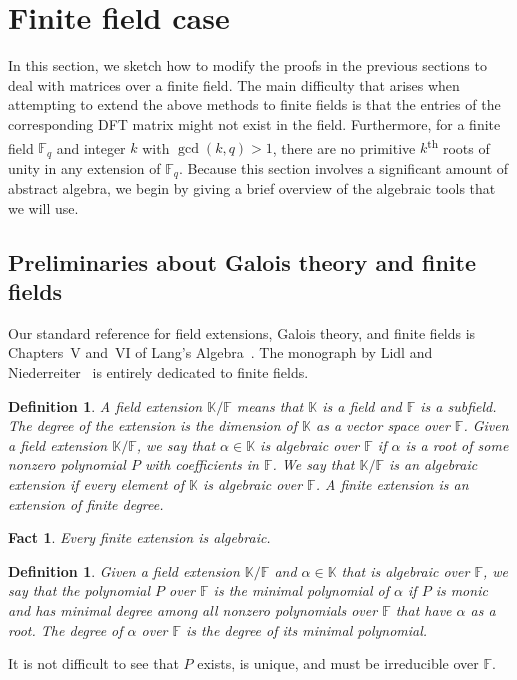 \documentclass{toc}
\newtheorem{define}[theorem]{Definition}
\newtheorem{fact.}[theorem]{Fact}
\newcommand\F{{\mathbb{F}}}
\newcommand\K{{\mathbb{K}}}
\newcommand{\ts}{\textsuperscript}
\begin{document}
%
%
%

%
\section{Finite field case}\label{sec_finitefield}  %
In this section, we sketch how to modify the proofs in the previous sections to deal with matrices over a finite field.  The main difficulty that arises when attempting to extend the above methods to finite fields is that the entries of the corresponding %
DFT %
 matrix might not exist in the field.  Furthermore, for a finite field $\F_q$ and integer $k$ with $\gcd(k,q) > 1$, there are no primitive $k$\ts{th} roots of unity %
in %
any extension of $\F_q$.  Because this section involves a significant amount of abstract algebra, we begin by giving a brief overview of the algebraic tools that we will use.

%
%
%
%

%
\subsection{Preliminaries about Galois theory and finite fields}
\label{sec:galois}
%
Our standard reference for field extensions, Galois theory,
and finite fields is Chapters~V and~VI of
Lang's Algebra~\cite{lang}.  The monograph by
Lidl and Niederreiter~\cite{lidl} is entirely dedicated  %
to finite fields.

\begin{define}
A field extension $\K/\F$ means that $\K$ is a field and $\F$ is
a subfield.  The \emph{degree} of the extension is the dimension
of $\K$ as a vector space over $\F$.  Given a field extension $\K/\F$,
we say that $\alpha \in \K$ is \emph{algebraic} over $\F$ if $\alpha$
is a root of some nonzero polynomial $P$ with coefficients in $\F$.
We say that $\K/\F$ is an \emph{algebraic extension} if every
element of $\K$ is algebraic over $\F$.  A \emph{finite extension}
is an extension of finite degree. 
\end{define}

\begin{fact.}
Every finite extension is algebraic.
\end{fact.}

\begin{define}
Given a field extension $\K/\F$ and $\alpha \in \K$ that is
algebraic over $\F$, we say that the polynomial $P$
over $\F$ is the \emph{minimal polynomial} of $\alpha$
if $P$ is monic and has minimal degree among all nonzero
polynomials over $\F$ that have $\alpha$ as a root.
The \emph{degree} of $\alpha$ over $\F$ is the degree of its
minimal polynomial.
\end{define}
It is not difficult to see that $P$ exists, is
unique, and must be irreducible over $\F$.
\end{document}
